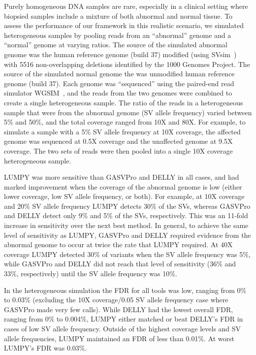 \documentclass[10pt]{bmc_article}
\newenvironment{bmcformat}{\begin{raggedright}\baselineskip20pt\sloppy\setboolean{publ}{false}}{\end{raggedright}\baselineskip20pt\sloppy}
\begin{document}
\begin{bmcformat}
Purely homogeneous DNA samples are rare, especially in a clinical setting where
biopsied samples include a mixture of both abnormal and normal tissue.  To
assess the performance of our framework in this realistic scenario, we simulated
heterogeneous samples by pooling reads from an ``abnormal'' genome and a
``normal'' genome at varying ratios.  The source of the simulated abnormal
genome was the human reference genome (build 37) modified (using
SVsim~\cite{faustunpub}) with 5516 non-overlapping deletions identified by the
1000 Genomes Project.  The  source of the simulated normal genome the was
unmodified human reference genome (build 37).  Each genome was ``sequenced''
using the paired-end read simulator WGSIM~\cite{liunpub}, and the reads from
the two genomes were combined to create a single heterogeneous sample.  The
ratio of the reads in a heterogeneous sample that were from the abnormal genome
(SV allele frequency) varied between 5\% and 50\%, and the total coverage ranged
from 10X and 80X.  For example, to simulate a sample with a 5\% SV allele
frequency at 10X coverage, the affected genome was sequenced at 0.5X coverage
and the unaffected genome at 9.5X coverage.  The two sets of reads were then
pooled into a single 10X coverage heterogeneous sample.

LUMPY was more sensitive than GASVPro and DELLY in all cases, and had marked
improvement when the coverage of the abnormal genome is low (either lower
coverage, low SV allele frequency, or both).  For example, at 10X coverage and
20\% SV allele frequency LUMPY detects 30\% of the SVs, whereas GASVPro and
DELLY detect only 9\% and 5\% of the SVs, respectively.  This was an 11-fold
increase in sensitivity over the next best method.  In general, to achieve the
same level of sensitivity as LUMPY, GASVPro and DELLY required evidence from
the abnormal genome to occur at twice the rate that LUMPY required.  At 40X
coverage LUMPY detected 30\% of variants when the SV allele frequency was 5\%,
while GASVPro and DELLY did not reach that level of sensitivity (36\% and 33\%,
respectively) until the SV allele frequency was 10\%.

In the heterogeneous simulation the FDR for all tools was low, ranging from 0\%
to 0.03\% (excluding the 10X coverage/0.05 SV allele frequency case where
GASVPro made very few calls).  While DELLY had the lowest overall FDR, ranging
from 0\% to 0.004\%, LUMPY either matched or beat DELLY’s FDR in cases of low SV
allele frequency.  Outside of the highest coverage levels and SV allele
frequencies, LUMPY maintained an FDR of less than 0.01\%.  At worst LUMPY's FDR
was 0.03\%.


\end{bmcformat}
\end{document}
